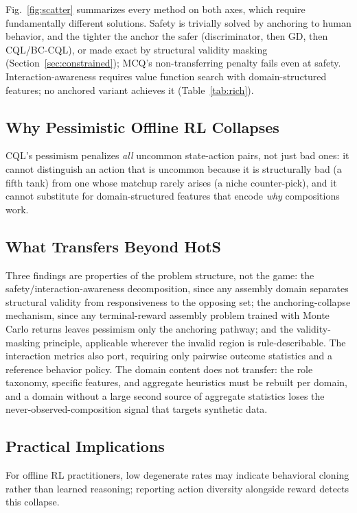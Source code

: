 \documentclass[journal]{IEEEtran}
\begin{document}
Fig.~\ref{fig:scatter} summarizes every method on both axes, which require fundamentally different solutions. Safety is trivially solved by anchoring to human behavior, and the tighter the anchor the safer (discriminator, then GD, then CQL/BC-CQL), or made exact by structural validity masking (Section~\ref{sec:constrained}); MCQ's non-transferring penalty fails even at safety. Interaction-awareness requires value function search with domain-structured features; no anchored variant achieves it (Table~\ref{tab:rich}).

\subsection{Why Pessimistic Offline RL Collapses}

CQL's pessimism penalizes \textit{all} uncommon state-action pairs, not just bad ones: it cannot distinguish an action that is uncommon because it is structurally bad (a fifth tank) from one whose matchup rarely arises (a niche counter-pick), and it cannot substitute for domain-structured features that encode \textit{why} compositions work.

\subsection{What Transfers Beyond HotS}

Three findings are properties of the problem structure, not the game: the safety/interaction-awareness decomposition, since any assembly domain separates structural validity from responsiveness to the opposing set; the anchoring-collapse mechanism, since any terminal-reward assembly problem trained with Monte Carlo returns leaves pessimism only the anchoring pathway; and the validity-masking principle, applicable wherever the invalid region is rule-describable. The interaction metrics also port, requiring only pairwise outcome statistics and a reference behavior policy. The domain content does not transfer: the role taxonomy, specific features, and aggregate heuristics must be rebuilt per domain, and a domain without a large second source of aggregate statistics loses the never-observed-composition signal that targets synthetic data.

\subsection{Practical Implications}

For offline RL practitioners, low degenerate rates may indicate behavioral cloning rather than learned reasoning; reporting action diversity alongside reward detects this collapse.
\end{document}
